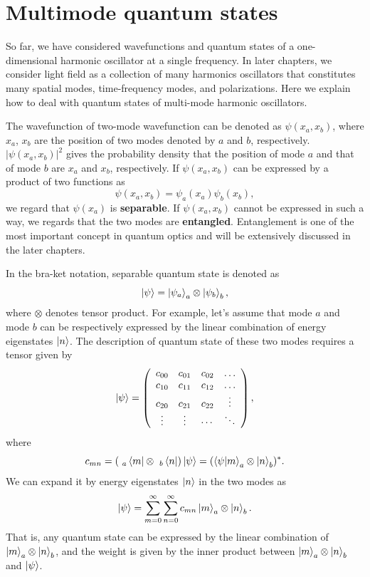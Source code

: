 \section{Multimode quantum states}
So far, we have considered wavefunctions and quantum states of a one-dimensional harmonic oscillator at a single frequency. In later chapters, we consider light field as a collection of many harmonics oscillators that constitutes many spatial modes, time-frequency modes, and polarizations. Here we explain how to deal with quantum states of multi-mode harmonic oscillators.

The wavefunction of two-mode wavefunction can be denoted as $\psi(x_a, x_b)$, where $x_a$, $x_b$ are the position of two modes denoted by $a$ and $b$, respectively. $|\psi(x_a,x_b)|^2$ gives the probability density that the position of mode $a$ and that of mode $b$ are $x_a$ and $x_b$, respectively. If $\psi(x_a, x_b)$ can be expressed by a product of two functions as
\begin{equation}
  \psi(x_a, x_b) = \psi_a(x_a)\psi_b(x_b),
  \label{eq:separable_wavefunction}
\end{equation}
we regard that $\psi(x_a)$ is \textbf{separable}. If $\psi(x_a, x_b)$ cannot be expressed in such a way, we regards that the two modes are \textbf{entangled}. Entanglement is one of the most important concept in quantum optics and will be extensively discussed in the later chapters.

In the bra-ket notation, separable quantum state is denoted as
\begin{equation}
  \ket \psi = \ket {\psi_a}_a \otimes \ket{\psi_b}_b,
\end{equation}
where $\otimes$ denotes tensor product. For example, let's assume that mode $a$ and mode $b$ can be respectively expressed by the linear combination of energy eigenstates $\ket n$. The description of quantum state of these two modes requires a tensor given by
\begin{equation}
  \ket{\psi}= \left(
  \begin{array}{cccc}
  c_{00} & c_{01} & c_{02} & \ldots \\
  c_{10} & c_{11} & c_{12} & \ldots \\
  c_{20} & c_{21} & c_{22} & \vdots \\
  \vdots & \vdots & \cdots & \ddots
  \end{array}
  \right),
\end{equation}
where 
\begin{equation}
  c_{mn} = (\ _a\bra m \otimes \ _b\bra n )\ket \psi = (\braket {\psi | m}_a \otimes \ket n_b)^*.
\end{equation}
We can expand it by energy eigenstates $\ket n$ in the two modes as
\begin{equation}
  \ket \psi = \sum_{m=0}^{\infty}\sum_{n=0}^{\infty}c_{mn}\ket m_a \otimes \ket n_b. 
\end{equation}
That is, any quantum state can be expressed by the linear combination of $\ket m_a \otimes \ket n_b$, and the weight is given by the inner product between $\ket m_a \otimes \ket n_b$ and $\ket \psi$.


